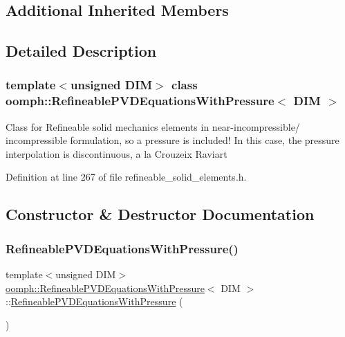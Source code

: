\subsection*{Additional Inherited Members}


\subsection{Detailed Description}
\subsubsection*{template$<$unsigned D\+IM$>$\newline
class oomph\+::\+Refineable\+P\+V\+D\+Equations\+With\+Pressure$<$ D\+I\+M $>$}

Class for Refineable solid mechanics elements in near-\/incompressible/ incompressible formulation, so a pressure is included! In this case, the pressure interpolation is discontinuous, a la Crouzeix Raviart 

Definition at line 267 of file refineable\+\_\+solid\+\_\+elements.\+h.



\subsection{Constructor \& Destructor Documentation}
\mbox{\label{classoomph_1_1RefineablePVDEquationsWithPressure_aba4ecfaa4b35b47d3279cd6887e2175a}} 
\subsubsection{\texorpdfstring{Refineable\+P\+V\+D\+Equations\+With\+Pressure()}{RefineablePVDEquationsWithPressure()}}
{\footnotesize\ttfamily template$<$unsigned D\+IM$>$ \\
\hyperlink{classoomph_1_1RefineablePVDEquationsWithPressure}{oomph\+::\+Refineable\+P\+V\+D\+Equations\+With\+Pressure}$<$ D\+IM $>$\+::\hyperlink{classoomph_1_1RefineablePVDEquationsWithPressure}{Refineable\+P\+V\+D\+Equations\+With\+Pressure} (\begin{DoxyParamCaption}{ }\end{DoxyParamCaption})\hspace{0.3cm}{\ttfamily [inline]}}



